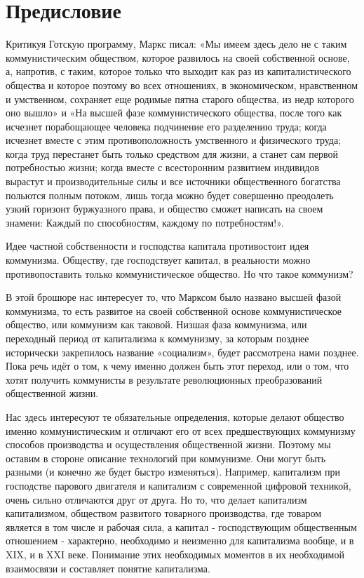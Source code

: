 \documentclass[../main]{subfiles}
\begin{document}
\ifSubfilesClassLoaded{\setcounter{page}{7}}{}
\section{Предисловие}
\label{sec:02_predislovie}

Критикуя Готскую программу, Маркс писал: «Мы имеем здесь дело не с таким коммунистическим обществом, которое развилось на своей собственной основе, а, напротив, с таким, которое только что выходит как раз из капиталистического общества и которое поэтому во всех отношениях, в экономическом, нравственном и умственном, сохраняет еще родимые пятна старого общества, из недр которого оно вышло» и «На высшей фазе коммунистического общества, после того как исчезнет порабощающее человека подчинение его разделению труда; когда исчезнет вместе с этим противоположность умственного и физического труда; когда труд перестанет быть только средством для жизни, а станет сам первой потребностью жизни; когда вместе с всесторонним развитием индивидов вырастут и производительные силы и все источники общественного богатства польются полным потоком, лишь тогда можно будет совершенно преодолеть узкий горизонт буржуазного права, и общество сможет написать на своем знамени: Каждый по способностям, каждому по потребностям!».

Идее частной собственности и господства капитала противостоит идея коммунизма. Обществу, где господствует капитал, в реальности можно противопоставить только коммунистическое общество. Но что такое коммунизм?

В этой брошюре нас интересует то, что Марксом было названо высшей фазой коммунизма, то есть развитое на своей собственной основе коммунистическое общество, или коммунизм как таковой. Низшая фаза коммунизма, или переходный период от капитализма к коммунизму, за которым позднее исторически закрепилось название «социализм», будет рассмотрена нами позднее. Пока речь идёт о том, к чему именно должен быть этот переход, или о том, что хотят получить коммунисты в результате революционных преобразований общественной жизни.

Нас здесь интересуют те обязательные определения, которые делают общество именно коммунистическим и отличают его от всех предшествующих коммунизму способов производства и осуществления общественной жизни. Поэтому мы оставим в стороне описание технологий при коммунизме. Они могут быть разными (и конечно же будет быстро изменяться). Например, капитализм при господстве парового двигателя и капитализм с современной цифровой техникой, очень сильно отличаются друг от друга. Но то, что делает капитализм капитализмом, обществом развитого товарного производства, где товаром является в том числе и рабочая сила, а капитал - господствующим общественным отношением - характерно, необходимо и неизменно для капитализма вообще, и в XIX, и в XXI веке. Понимание этих необходимых моментов в их необходимой взаимосвязи и составляет понятие капитализма.
\end{document}
